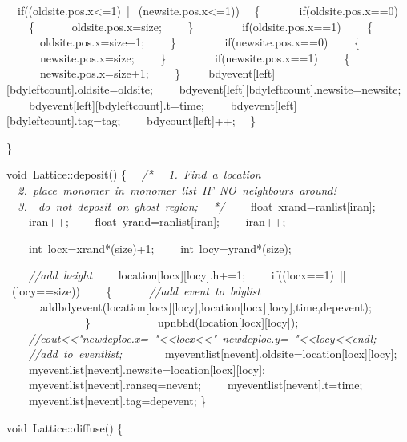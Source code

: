 {\ \ if((oldsite.pos.x<{}=1)\ ||\ (newsite.pos.x<{}=1))
\ \ \{\ \ \
\ \ \ \ if(oldsite.pos.x==0)
\ \ \ \ \{
\ \ \ \ \ \ oldsite.pos.x=size;
\ \ \ \ \}
\ \ \ \
\ \ \ \ if(oldsite.pos.x==1)
\ \ \ \ \{
\ \ \ \ \ \ oldsite.pos.x=size+1;
\ \ \ \ \}
\ \ \ \
\ \ \ \ if(newsite.pos.x==0)
\ \ \ \ \{
\ \ \ \ \ \ newsite.pos.x=size;
\ \ \ \ \}
\ \ \ \
\ \ \ \ if(newsite.pos.x==1)
\ \ \ \ \{
\ \ \ \ \ \ newsite.pos.x=size+1;
\ \ \ \ \}\
\ \ \ \ bdyevent[left][bdyleftcount].oldsite=oldsite;
\ \ \ \ bdyevent[left][bdyleftcount].newsite=newsite;
\ \ \ \ bdyevent[left][bdyleftcount].t=time;
\ \ \ \ bdyevent[left][bdyleftcount].tag=tag;
\ \ \ \ bdycount[left]++;
\ \ \}

\}


void\ Lattice::deposit()
\{
\ \ \textsl{/*
\ \ 1.\ Find\ a\ location
\ \ 2.\ place\ monomer\ in\ monomer\ list\ IF\ NO\ neighbours\ around!
\ \ 3.\ \ do\ not\ deposit\ on\ ghost\ region;
\ \ */}
\ \ \ \ float\ xrand=ranlist[iran];
\ \ \ \ iran++;
\ \ \ \ float\ yrand=ranlist[iran];
\ \ \ \ iran++;

\ \ \ \ int\ locx=xrand*(size)+1;
\ \ \ \ int\ locy=yrand*(size);

\ \ \ \ \textsl{//add\ height}
\ \ \ \ location[locx][locy].h+=1;
\ \ \ \ if((locx==1)\ ||\ (locy==size))
\ \ \ \ \{
\ \ \ \ \ \ \textsl{//add\ event\ to\ bdylist}
\ \ \ \ \ \ addbdyevent(location[locx][locy],location[locx][locy],time,depevent);
\ \ \ \ \ \ \ \ \ \
\ \ \ \ \}\ \ \ \ \ \ \ \
\ \ \ \ upnbhd(location[locx][locy]);
\ \ \ \ \textsl{//cout<{}<{}"{}newdeploc.x=\ "{}<{}<{}locx<{}<{}"{}\ newdeploc.y=\ "{}<{}<{}locy<{}<{}endl;\ }
\ \ \ \ \textsl{//add\ to\ eventlist;}
\ \ \
\ \ \ \ myeventlist[nevent].oldsite=location[locx][locy];
\ \ \ \ myeventlist[nevent].newsite=location[locx][locy];
\ \ \ \ myeventlist[nevent].ranseq=nevent;
\ \ \ \ myeventlist[nevent].t=time;
\ \ \ \ myeventlist[nevent].tag=depevent;
\}

void\ Lattice::diffuse()
\{

}
